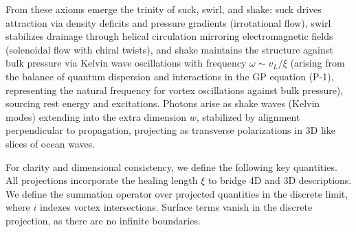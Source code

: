 From these axioms emerge the trinity of suck, swirl, and shake: suck drives attraction via density deficits and pressure gradients (irrotational flow), swirl stabilizes drainage through helical circulation mirroring electromagnetic fields (solenoidal flow with chiral twists), and shake maintains the structure against bulk pressure via Kelvin wave oscillations with frequency $\omega \sim v_L / \xi$ (arising from the balance of quantum dispersion and interactions in the GP equation (P-1), representing the natural frequency for vortex oscillations against bulk pressure), sourcing rest energy and excitations. Photons arise as shake waves (Kelvin modes) extending into the extra dimension $w$, stabilized by alignment perpendicular to propagation, projecting as transverse polarizations in 3D like slices of ocean waves.

For clarity and dimensional consistency, we define the following key quantities. All projections incorporate the healing length $\xi$ to bridge 4D and 3D descriptions. We define the summation operator over projected quantities in the discrete limit, where $i$ indexes vortex intersections. Surface terms vanish in the discrete projection, as there are no infinite boundaries.

